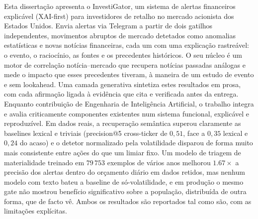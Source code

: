\begin{abstractotherlanguage}


Esta dissertação apresenta o InvestiGator, um sistema de alertas financeiros explicável (XAI-first)
para investidores de retalho no mercado acionista dos Estados Unidos. Envia alertas via Telegram a
partir de dois gatilhos independentes, movimentos abruptos de mercado detetados como anomalias
estatísticas e novas notícias financeiras, cada um com uma explicação rastreável: o evento, o
raciocínio, as fontes e os precedentes históricos. O seu núcleo é um motor de correlação
notícia--mercado que recupera notícias passadas análogas e mede o impacto que esses precedentes
tiveram, à maneira de um estudo de evento e sem lookahead. Uma camada generativa sintetiza estes
resultados em prosa, com cada afirmação ligada à evidência que cita e verificada antes da entrega.
Enquanto contribuição de Engenharia de Inteligência Artificial, o trabalho integra e avalia
criticamente componentes existentes num sistema funcional, explicável e reproduzível. Em dados
reais, a recuperação semântica superou claramente as baselines lexical e triviais (precision@5
cross-ticker de $0{,}51$, face a $0{,}35$ lexical e $0{,}24$ do acaso) e o detetor normalizado pela
volatilidade disparou de forma muito mais consistente entre ações do que um limiar fixo. Um modelo
de triagem de materialidade treinado em $79\,753$ exemplos de vários anos melhorou $1.67\times$ a
precisão dos alertas dentro do orçamento diário em dados retidos, mas nenhum modelo com texto bateu
a baseline de só-volatilidade, e em produção o mesmo gate não mostrou benefício significativo sobre
a população, distribuída de outra forma, que de facto vê. Ambos os resultados são reportados tal
como são, com as limitações explícitas.

\end{abstractotherlanguage}


